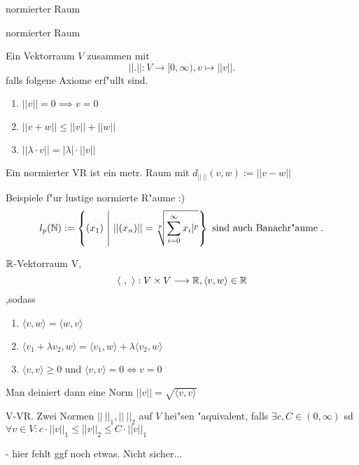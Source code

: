 \documentclass[class=article, crop=false]{standalone}
\begin{document}
\begin{zettel}{normierter Raum}
\begin{flashcard}[i9n60cq1]{normierter Raum}
	\begin{definition}
		Ein Vektorraum $V$ zusammen mit
		\[
			|| . ||: V \longrightarrow [0, \infty), v \mapsto  ||v||
		.\]
		falls folgene Axiome erf"ullt sind.
		\begin{enumerate}
			\item $||v|| = 0 \implies v = 0 $
			\item $||v + w || \leq  ||v|| + ||w||$
			\item $||\lambda \cdot v|| = |\lambda | \cdot ||v||$
		\end{enumerate}
	\end{definition}
	Ein normierter VR ist ein metr. Raum mit $ d_{ ||\ ||} (v,w) := ||v -w||$
\end{flashcard}

\begin{remark}
	Beispiele f"ur lustige normierte R"aume :)
	\[
		l_p (\mathbb{N}) := \set{ (x_1 )}{ ||(x_n)|| = \sqrt[p]{\sum_{i=0}^{\infty}
				x_i|^p}  } \text{ sind auch Banachr"aume }
	.\]

	\begin{example}[Hilbertraum?]
		$\mathbb{R}$-Vektorraum V,
		\[
			\langle \ , \ \rangle : V \times V \longrightarrow \mathbb{R}, \langle v,w\rangle \in  \mathbb{R}
		\] ,sodass
		\begin{enumerate}
			\item $ \langle v,w\rangle  =  \langle w,v\rangle $
			\item $ \langle v_1+\lambda v_2,w\rangle =  \langle v_1 ,w\rangle  + \lambda \langle v_2,w\rangle $
			\item $ \langle v,v\rangle \geq 0$ und $ \langle v,v\rangle = 0 \iff  v = 0$

		\end{enumerate}
		Man deiniert dann eine Norm $||v|| = \sqrt{ \langle v,v\rangle }$

	\end{example}
\end{remark}

\begin{definition}
	V-VR. Zwei Normen $||\ ||_1, ||\ ||_2 $ auf $V$ hei"sen "aquivalent, falls $\exists c, C \in  (0,\infty) $ sd
	$\forall  v \in  V : c \cdot  ||v||_1 \leq ||v||_2 \leq C \cdot ||v||_1$

	- hier fehlt ggf noch etwas. Nicht sicher...
\end{definition}
\end{zettel}
\end{document}
